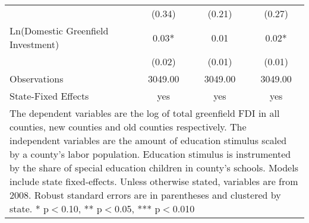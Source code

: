 \begin{table}[!htbp]
\begin{tabular}{l*{3}{c}}
                    &      (0.34)   &      (0.21)   &      (0.27)   \\
Ln(Domestic Greenfield Investment)&        0.03*  &        0.01   &        0.02*  \\
                    &      (0.02)   &      (0.01)   &      (0.01)   \\
\hline
Observations        &     3049.00   &     3049.00   &     3049.00   \\
State-Fixed Effects &         yes   &         yes   &         yes   \\
\hline\hline
\multicolumn{4}{p{\linewidth}}{\footnotesize The dependent variables are the log of total greenfield FDI in all counties, new counties and old counties respectively. The independent variables are the amount of education stimulus scaled by a county's labor population. Education stimulus is instrumented by the share of special education children in county's schools. Models include state fixed-effects. Unless otherwise stated, variables are from 2008. Robust standard errors are in parentheses and clustered by state. * p$<$0.10, ** p$<$0.05, *** p$<$0.010}\\
\end{tabular}
\end{table}
